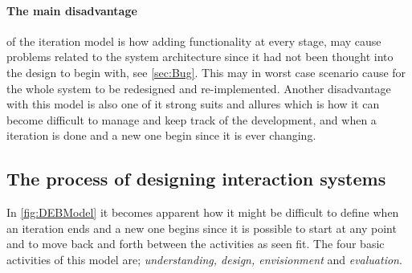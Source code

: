 \paragraph{The main disadvantage} of the iteration model is how adding functionality at every stage, may cause problems related to the system architecture since it had not been thought into the design to begin with, see \cref{sec:Bug}.
This may in worst case scenario cause for the whole system to be redesigned and re-implemented.
Another disadvantage with this model is also one of it strong suits and allures which is how it can become difficult to manage and keep track of the development, and when a iteration is done and a new one begin since it is ever changing.


\subsection{The process of designing interaction systems}\label{sec:Iterative1}
In \cref{fig:DEBModel} it becomes apparent how it might be difficult to define when an iteration ends and a new one begins since it is possible to start at any point and to move back and forth between the activities as seen fit.
The four basic activities of this model are; \textit{understanding, design, envisionment} and \textit{evaluation}.

